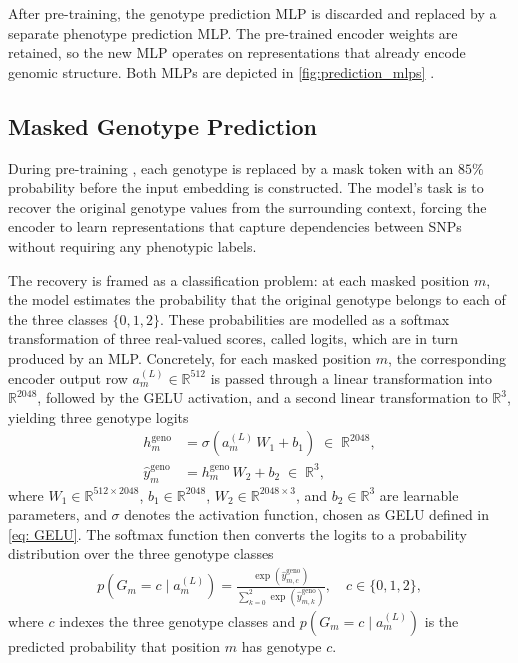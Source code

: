 After pre-training, the genotype prediction MLP is discarded and replaced by a separate phenotype prediction MLP. The pre-trained encoder weights are retained, so the new MLP operates on representations that already encode genomic structure. Both MLPs are depicted in \autoref{fig:prediction_mlps} \citep{SNPbag}.


\subsection{Masked Genotype Prediction} \label{sec:mgp}
During pre-training \citep{Devlin2019}, each genotype is replaced by a mask
token with an $85\%$ probability before the input embedding is constructed.
The model's task is to recover the original genotype values from the
surrounding context, forcing the encoder to learn representations that
capture dependencies between SNPs without requiring any phenotypic labels.

The recovery is framed as a classification problem: at each masked position
$m$, the model estimates the probability that the original genotype belongs
to each of the three classes $\{0, 1, 2\}$. These probabilities are modelled
as a softmax transformation of three real-valued scores, called logits,
which are in turn produced by an MLP. Concretely, for each masked position
$m$, the corresponding encoder output row $a^{(L)}_m \in \mathbb{R}^{512}$
is passed through a linear transformation into $\mathbb{R}^{2048}$, followed
by the GELU activation, and a second linear transformation to
$\mathbb{R}^{3}$, yielding three genotype logits
\begin{align*}
    h_m^{\mathrm{geno}} &= \sigma(a^{(L)}_m\, W_1 + b_1)
      \;\in\; \mathbb{R}^{2048},  \\
    \hat{y}_m^{\mathrm{geno}} &= h_m^{\mathrm{geno}}\, W_2 + b_2
      \;\in\; \mathbb{R}^{3},
\end{align*}
where $W_1 \in \mathbb{R}^{512 \times 2048}$,
$b_1 \in \mathbb{R}^{2048}$,
$W_2 \in \mathbb{R}^{2048 \times 3}$, and
$b_2 \in \mathbb{R}^{3}$ are learnable parameters, and
$\sigma$ denotes the activation function, chosen as GELU defined
in \eqref{eq: GELU}. The softmax function then converts the logits
to a probability distribution over the three genotype classes
\begin{align*}
    p(G_m = c \mid a^{(L)}_m)
    = \frac{\exp(\hat{y}_{m,c}^{\mathrm{geno}})}
           {\sum_{k=0}^{2} \exp(\hat{y}_{m,k}^{\mathrm{geno}})},
    \quad c \in \{0, 1, 2\},
\end{align*}
where $c$ indexes the three genotype classes and
$p(G_m = c \mid a^{(L)}_m)$ is the predicted probability that position
$m$ has genotype $c$.

